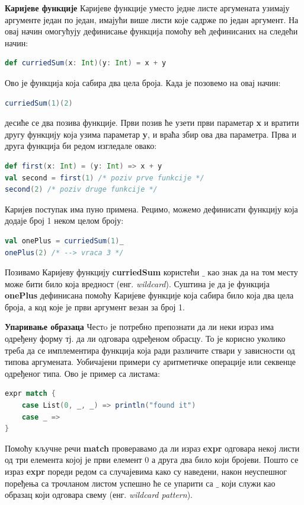 \documentclass[12pt,oneside]{memoir}
\begin{document}
\begin{description}
\item \textbf{Каријеве функције} %
Каријеве функције уместо једне листе аргумената узимају аргументе један по један, имајући више листи које садрже по један аргумент. На овај начин омогућују дефинисање функција помоћу већ дефинисаних на следећи начин:
\begin{lstlisting}[language=Scala]
def curriedSum(x: Int)(y: Int) = x + y
\end{lstlisting}
Ово је функција која сабира два цела броја. Када је позовемо на овај начин:
\begin{lstlisting}[language=Scala]
curriedSum(1)(2)
\end{lstlisting}
десиће се два позива функције. Први позив ће узети први параметар \textbf{x} и вратити другу функцију која узима параметар \textbf{y}, и враћа збир ова два параметра. Прва и друга функција би редом изгледале овако:
\begin{lstlisting}[language=Scala]
def first(x: Int) = (y: Int) => x + y
val second = first(1) /* poziv prve funkcije */
second(2) /* poziv druge funkcije */
\end{lstlisting}
Каријев поступак има пуно примена. Рецимо, можемо дефинисати функцију која додаје број 1 неком целом броју:
\begin{lstlisting}[language=Scala]
val onePlus = curriedSum(1)_
onePlus(2) /* --> vraca 3 */
\end{lstlisting}
Позивамо Каријеву функцију \textbf{curriedSum} користећи \textbf{$\_$} као знак да на том месту може бити било која вредност (енг. \textit{wildcard}). Суштина је да је функција \textbf{onePlus} дефинисана помоћу Каријеве функције која сабира било која два цела броја, а код које је први аргумент везан за број 1.
\item \textbf{Упаривање образаца}
\label{uparObr}
Честo је потребно препознати да ли неки израз има одређену форму тј. да ли одговара одређеном обрасцу. То је корисно уколико треба да се имплементира функција која ради различите ствари у зависности од типова аргумената. Уобичајени примери су аритметичке операције или секвенце одређеног типа. Ово је пример са листама: 
\begin{lstlisting}[language=Scala]
expr match {
	case List(0, _, _) => println("found it")
	case _ =>
}
\end{lstlisting}
Помоћу кључне речи \textbf{match} проверавамо да ли израз \textbf{expr} одговара некој листи од три елемента којој је први елемент 0 а друга два било који бројеви. Пошто се израз \textbf{expr} пореди редом са случајевима како су наведени, након неуспешног поређења са трочланом листом успешно ће се упарити са \textbf{$\_$} који служи као образац који одговара свему (енг. \textit{wildcard pattern}). 


\end{description}
\end{document}
